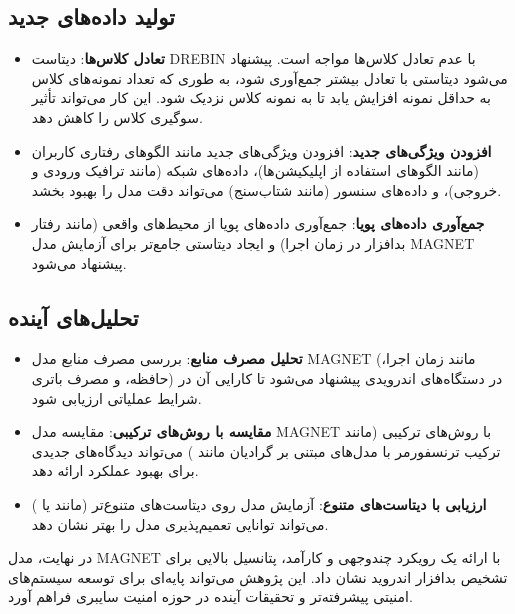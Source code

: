 \subsection{تولید داده‌های جدید}
\begin{itemize}
    \item \textbf{تعادل کلاس‌ها}: دیتاست DREBIN با عدم تعادل کلاس‌ها مواجه است. پیشنهاد می‌شود دیتاستی با تعادل بیشتر جمع‌آوری شود، به طوری که تعداد نمونه‌های کلاس  به حداقل  نمونه افزایش یابد تا به  نمونه کلاس  نزدیک شود. این کار می‌تواند تأثیر سوگیری کلاس را کاهش دهد.
    \item \textbf{افزودن ویژگی‌های جدید}: افزودن ویژگی‌های جدید مانند الگوهای رفتاری کاربران (مانند الگوهای استفاده از اپلیکیشن‌ها)، داده‌های شبکه (مانند ترافیک ورودی و خروجی)، و داده‌های سنسور (مانند شتاب‌سنج) می‌تواند دقت مدل را بهبود بخشد.
    \item \textbf{جمع‌آوری داده‌های پویا}: جمع‌آوری داده‌های پویا از محیط‌های واقعی (مانند رفتار بدافزار در زمان اجرا) و ایجاد دیتاستی جامع‌تر برای آزمایش مدل MAGNET پیشنهاد می‌شود.
\end{itemize}

\subsection{تحلیل‌های آینده}
\begin{itemize}
    \item \textbf{تحلیل مصرف منابع}: بررسی مصرف منابع مدل MAGNET (مانند زمان اجرا، حافظه، و مصرف باتری) در دستگاه‌های اندرویدی پیشنهاد می‌شود تا کارایی آن در شرایط عملیاتی ارزیابی شود.
    \item \textbf{مقایسه با روش‌های ترکیبی}: مقایسه مدل MAGNET با روش‌های ترکیبی (مانند ترکیب ترنسفورمر با مدل‌های مبتنی بر گرادیان مانند ) می‌تواند دیدگاه‌های جدیدی برای بهبود عملکرد ارائه دهد.
    \item \textbf{ارزیابی با دیتاست‌های متنوع}: آزمایش مدل روی دیتاست‌های متنوع‌تر (مانند  \cite{CICMalDroid} یا  ) می‌تواند توانایی تعمیم‌پذیری مدل را بهتر نشان دهد.
\end{itemize}

در نهایت، مدل MAGNET با ارائه یک رویکرد چندوجهی و کارآمد، پتانسیل بالایی برای تشخیص بدافزار اندروید نشان داد. این پژوهش می‌تواند پایه‌ای برای توسعه سیستم‌های امنیتی پیشرفته‌تر و تحقیقات آینده در حوزه امنیت سایبری فراهم آورد.
